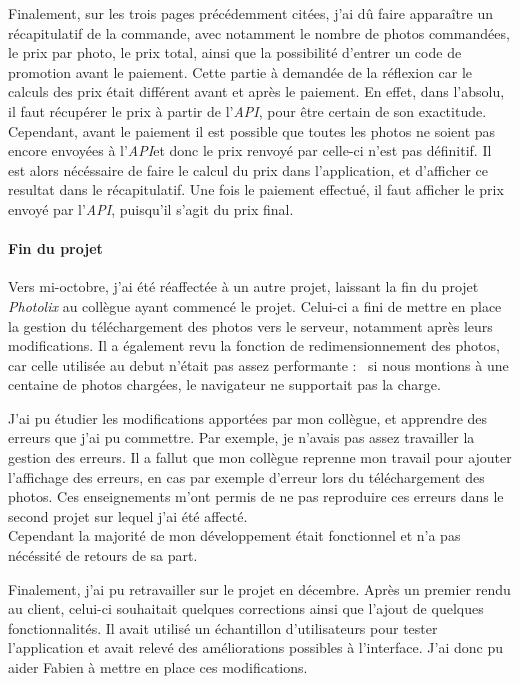 \bigskip

Finalement, sur les trois pages précédemment citées, j'ai dû faire
apparaître un récapitulatif de la commande, avec notamment le nombre de
photos commandées, le prix par photo, le prix total, ainsi que la
possibilité d'entrer un code de promotion avant le paiement. Cette
partie à demandée de la réflexion car le calculs des prix était
différent avant et après le paiement. En effet, dans l'absolu, il faut
récupérer le prix à partir de l'\emph{API}, pour être certain de son
exactitude. Cependant, avant le paiement il est possible que toutes les
photos ne soient pas encore envoyées à l'\emph{API}et donc le prix
renvoyé par celle-ci n'est pas définitif. Il est alors nécéssaire de
faire le calcul du prix dans l'application, et d'afficher ce resultat
dans le récapitulatif. Une fois le paiement effectué, il faut afficher
le prix envoyé par l'\emph{API}, puisqu'il s'agit du prix final.

\bigskip

\paragraph{Fin du projet}\label{fin-du-projet}

\bigskip

Vers mi-octobre, j'ai été réaffectée à un autre projet, laissant la fin
du projet \emph{Photolix} au collègue ayant commencé le projet. Celui-ci
a fini de mettre en place la gestion du téléchargement des photos vers
le serveur, notamment après leurs modifications. Il a également revu la
fonction de redimensionnement des photos, car celle utilisée au debut
n'était pas assez performante : ~si nous montions à une centaine de
photos chargées, le navigateur ne supportait pas la charge.

\bigskip

J'ai pu étudier les modifications apportées par mon collègue, et
apprendre des erreurs que j'ai pu commettre. Par exemple, je n'avais pas
assez travailler la gestion des erreurs. Il a fallut que mon collègue
reprenne mon travail pour ajouter l'affichage des erreurs, en cas par
exemple d'erreur lors du téléchargement des photos. Ces enseignements
m'ont permis de ne pas reproduire ces erreurs dans le second projet sur
lequel j'ai été affecté.\\
Cependant la majorité de mon développement était fonctionnel et n'a pas
nécéssité de retours de sa part.

\bigskip

Finalement, j'ai pu retravailler sur le projet en décembre. Après un
premier rendu au client, celui-ci souhaitait quelques corrections ainsi
que l'ajout de quelques fonctionnalités. Il avait utilisé un échantillon
d'utilisateurs pour tester l'application et avait relevé des
améliorations possibles à l'interface. J'ai donc pu aider Fabien à
mettre en place ces modifications.

